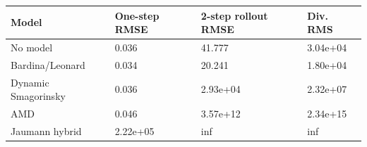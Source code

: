\begin{tabular}{llll}
\toprule
Model & One-step RMSE & 2-step rollout RMSE & Div. RMS \\
\midrule
No model & 0.036 & 41.777 & 3.04e+04 \\
Bardina/Leonard & 0.034 & 20.241 & 1.80e+04 \\
Dynamic Smagorinsky & 0.036 & 2.93e+04 & 2.32e+07 \\
AMD & 0.046 & 3.57e+12 & 2.34e+15 \\
Jaumann hybrid & 2.22e+05 & inf & inf \\
\bottomrule
\end{tabular}

